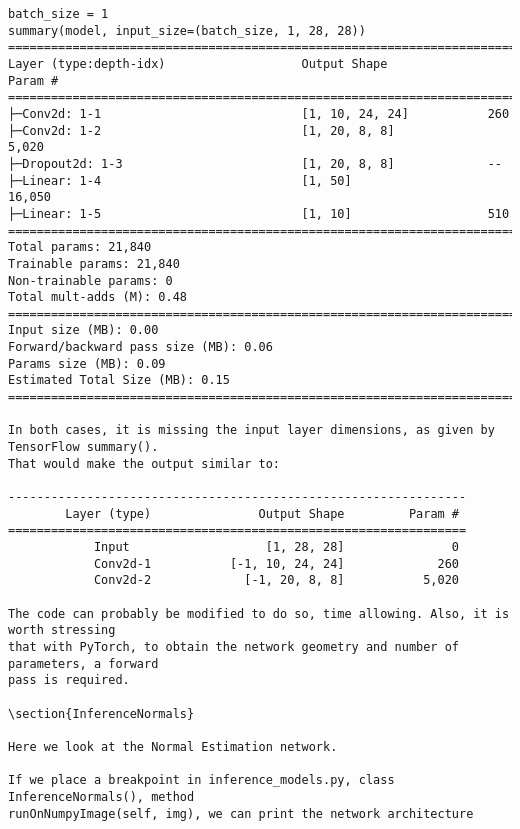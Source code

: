 \begin{verbatim}
batch_size = 1
summary(model, input_size=(batch_size, 1, 28, 28))
==========================================================================================
Layer (type:depth-idx)                   Output Shape              Param #
==========================================================================================
├─Conv2d: 1-1                            [1, 10, 24, 24]           260
├─Conv2d: 1-2                            [1, 20, 8, 8]             5,020
├─Dropout2d: 1-3                         [1, 20, 8, 8]             --
├─Linear: 1-4                            [1, 50]                   16,050
├─Linear: 1-5                            [1, 10]                   510
==========================================================================================
Total params: 21,840
Trainable params: 21,840
Non-trainable params: 0
Total mult-adds (M): 0.48
==========================================================================================
Input size (MB): 0.00
Forward/backward pass size (MB): 0.06
Params size (MB): 0.09
Estimated Total Size (MB): 0.15
==========================================================================================

In both cases, it is missing the input layer dimensions, as given by TensorFlow summary().
That would make the output similar to:

----------------------------------------------------------------
        Layer (type)               Output Shape         Param #
================================================================
            Input                   [1, 28, 28]               0
            Conv2d-1           [-1, 10, 24, 24]             260
            Conv2d-2             [-1, 20, 8, 8]           5,020
            
The code can probably be modified to do so, time allowing. Also, it is worth stressing
that with PyTorch, to obtain the network geometry and number of parameters, a forward
pass is required.

\section{InferenceNormals}

Here we look at the Normal Estimation network.

If we place a breakpoint in inference_models.py, class InferenceNormals(), method
runOnNumpyImage(self, img), we can print the network architecture


\end{verbatim}
